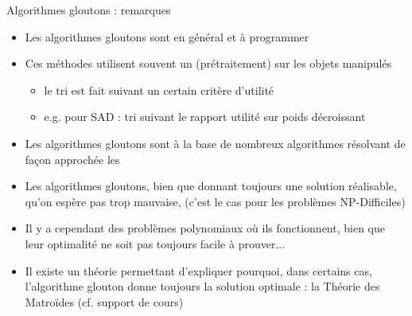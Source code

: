 \documentclass[aspectratio=1610,francais,envcountsect]{beamer}
\begin{document}
\begin{frame}{Algorithmes gloutons : remarques}

  \begin{itemize}
  \item Les algorithmes gloutons sont en général 
    et à programmer
  \item Ces méthodes utilisent souvent un 
    (prétraitement) sur les objets manipulés
    \begin{itemize}
    \item le tri est fait suivant un certain critère d’utilité
    \item e.g. pour SAD : tri suivant le rapport utilité sur poids
      décroissant
    \end{itemize}
  \item Les algorithmes gloutons sont à la base de nombreux
    algorithmes résolvant de façon approchée les 
  \item Les algorithmes gloutons, bien que donnant toujours une
    solution réalisable, qu’on espère pas trop mauvaise,  (c’est le cas pour les
    problèmes NP-Difficiles)
  \item Il y a cependant des problèmes
    polynomiaux où ils fonctionnent, bien que leur optimalité ne soit
    pas toujours facile à prouver...
    
  \item Il existe un théorie permettant d’expliquer pourquoi, dans certains cas, l’algorithme glouton donne toujours la solution optimale : la \alert{Théorie des Matroïdes} (cf. support de cours)
  \end{itemize}
  
\end{frame}

\end{document}
